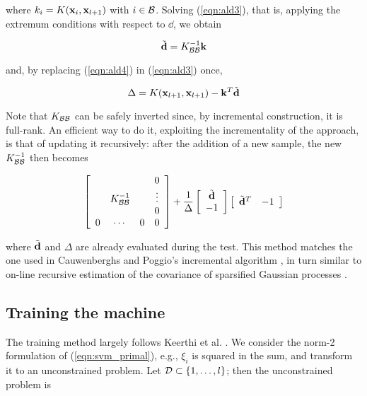 \noindent where $k_i = K(\mathbf{x}_i,\mathbf{x}_{l+1})$ with $i \in \mathcal{B}$. Solving
(\ref{eqn:ald3}), that is, applying the extremum conditions with
respect to $\dd$, we obtain

\begin{equation} \label{eqn:ald4}
  \tilde{\mathbf{d}} = K_{\mathcal{B}\mathcal{B}}^{-1} \mathbf{k} \\
\end{equation}

\noindent and, by replacing (\ref{eqn:ald4}) in (\ref{eqn:ald3}) once,

\begin{equation} \label{eqn:ald5}
  \Delta = K(\mathbf{x}_{l+1},\mathbf{x}_{l+1}) - \mathbf{k}^T \tilde{\mathbf{d}}
\end{equation}

Note that $K_{\mathcal{B}\mathcal{B}}$ can be safely inverted since, by incremental
construction, it is full-rank. An efficient way to do it, exploiting
the incrementality of the approach, is that of updating it
recursively: after the addition of a new sample, the new
$K_{\mathcal{B}\mathcal{B}}^{-1}$ then becomes

\begin{equation} \label{eqn:inv_upd}
  \left[\begin{array}{cccc}
       &               &   & 0 \\
       & K_{\mathcal{B}\mathcal{B}}^{-1} &   & \vdots \\
       &               &   & 0 \\
     0 &       \cdots  & 0 & 0
  \end{array}\right]
  +
  \frac{1}{\Delta}
  \left[\begin{array}{c}
    \tilde{\mathbf{d}} \\
    -1
  \end{array}\right]
  \left[\begin{array}{cc}
    \tilde{\mathbf{d}}^T & -1
  \end{array}\right]
\end{equation}

\noindent where $\tilde{\mathbf{d}}$ and $\Delta$ are already evaluated during the test. This
method matches the one used in Cauwenberghs and Poggio's incremental
algorithm \cite{CauwenberghsP00}, in turn similar to on-line recursive
estimation of the covariance of sparsified Gaussian processes
\cite{csat'o01sparse}.

\subsection*{Training the machine}

The training method largely follows Keerthi et
al. \cite{KeerthiDC05,KeerthiCDC06}. We consider the norm-2
formulation of (\ref{eqn:svm_primal}), e.g., $\xi_i$ is squared in the
sum, and transform it to an unconstrained problem. Let $\mathcal{D} \subset
\{1,\ldots,l\}$; then the unconstrained problem is


